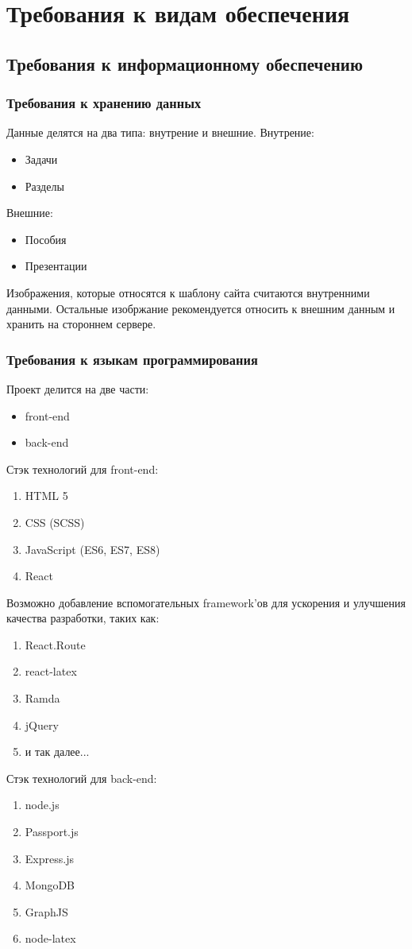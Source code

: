 \section{Требования к видам обеспечения}
\subsection{Требования к информационному обеспечению}
\subsubsection{Требования к хранению данных}
Данные делятся на два типа: внутрение и внешние.
Внутрение:
\begin{itemize}
    \item Задачи
    \item Разделы
\end{itemize}
Внешние:
\begin{itemize}
    \item Пособия
    \item Презентации
\end{itemize}

Изображения, которые относятся к шаблону сайта считаются внутренними данными. Остальные изобржание рекомендуется относить к внешним данным и хранить на стороннем сервере.
\subsubsection{Требования к языкам программирования}
Проект делится на две части:
\begin{itemize}
    \item front-end
    \item back-end
\end{itemize}
Стэк технологий для front-end:
\begin{enumerate}
    \item HTML 5
    \item CSS (SCSS)
    \item JavaScript (ES6, ES7, ES8)
    \item React
\end{enumerate}
Возможно добавление вспомогательных framework'ов для ускорения и улучшения качества разработки, таких как:
\begin{enumerate}
    \item React.Route
    \item react-latex
    \item Ramda
    \item jQuery
    \item и так далее...
\end{enumerate}
Стэк технологий для back-end:
\begin{enumerate}
    \item node.js
    \item Passport.js
    \item Express.js
    \item MongoDB
    \item GraphJS
    \item node-latex
\end{enumerate}
